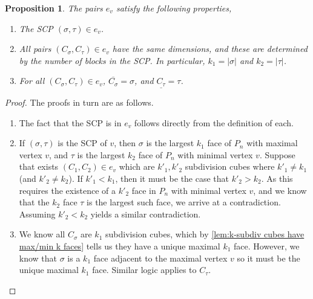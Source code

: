 \documentclass{amsart}
\newtheorem{proposition}[theorem]{Proposition}
\theoremstyle{definition}
\newcommand{\subdivpairsv}{e_v}
\begin{document}
\begin{proposition}\label{prop:ev properties}
The pairs $\subdivpairsv$ satisfy the following properties,
\begin{enumerate}
    \item The SCP $(\sigma,\tau) \in \subdivpairsv$.
    \item All pairs $(C_\sigma,C_\tau) \in \subdivpairsv$ have the same dimensions, and these are determined by the number of blocks in the SCP. In particular, $k_1=|\sigma|$ and $k_2 = |\tau|$. 
    \item For all $(C_\sigma,C_\tau) \in \subdivpairsv$, $\overline{C_\sigma} = \sigma$, and $\underline{C_\tau} = \tau$.
\end{enumerate}
\end{proposition}
\begin{proof}
The proofs in turn are as follows.
\begin{enumerate}
    \item The fact that the SCP is in $\subdivpairsv$ follows directly from the definition of each.
    \item If $(\sigma,\tau)$ is the SCP of $v$, then $\sigma$ is the largest $k_1$ face of $P_n$ with maximal vertex $v$, and $\tau$ is the largest $k_2$ face of $P_n$ with minimal vertex $v$.    
    Suppose that exists $(C_1,C_2) \in \subdivpairsv$ which are $k'_1, k'_2$ subdivision cubes where $k'_1\neq k_1$ (and $k'_2\neq k_2$).
    If $k'_1< k_1$, then it must be the case that $k'_2> k_2$.
    As this requires the existence of a $k'_2$ face in $P_n$ with minimal vertex $v$, and we know that the $k_2$ face $\tau$ is the largest such face, we arrive at a contradiction.
    Assuming $k'_2<k_2$ yields a similar contradiction.
    \item We know all $C_\sigma$ are $k_1$ subdivision cubes, which by \cref{lem:k-subdiv cubes have max/min k faces} tells us they have a unique maximal $k_1$ face.
    However, we know that $\sigma$ is a $k_1$ face adjacent to the maximal vertex $v$ so it must be the unique maximal $k_1$ face.
    Similar logic applies to $C_\tau$.
\end{enumerate}
\end{proof}
\end{document}
